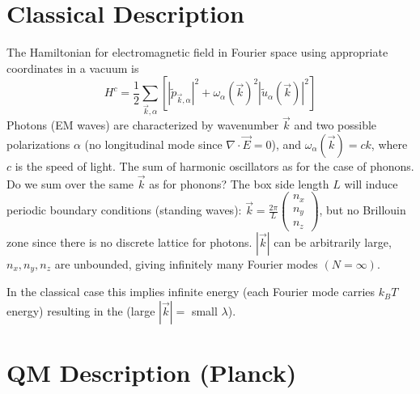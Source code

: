 \documentclass[12pt, a4paper, oneside, openright, titlepage]{book}
\begin{document}
\section{Classical Description}

The Hamiltonian for electromagnetic field in Fourier space using appropriate coordinates in a vacuum is \begin{equation*}
    H^c = \frac{1}{2}\sum_{\vec{k},\alpha}\left[|\tilde{p}_{\vec{k},\alpha}|^2 + \omega_{\alpha}(\vec{k})^2|\tilde{u}_{\alpha}(\vec{k})|^2\right]
\end{equation*}
Photons (EM waves) are characterized by wavenumber $\vec{k}$ and two possible polarizations $\alpha$ (no longitudinal mode since $\nabla\cdot\vec{E} = 0$), and $\omega_{\alpha}(\vec{k}) = ck$, where $c$ is the speed of light. The sum of harmonic oscillators as for the case of phonons. Do we sum over the same $\vec{k}$ as for phonons? The box side length $L$ will induce periodic boundary conditions (standing waves): $\vec{k} = \frac{2\pi}{L}\begin{pmatrix} n_x \\ n_y \\ n_z\end{pmatrix}$, but no Brillouin zone since there is no discrete lattice for photons. $|\vec{k}|$ can be arbitrarily large, $n_x,n_y,n_z$ are unbounded, giving infinitely many Fourier modes $(N = \infty)$.

In the classical case this implies infinite energy (each Fourier mode carries $k_BT$ energy) resulting in the  (large $|\vec{k}| = $ small $\lambda$).

\section{QM Description (Planck)}
\end{document}
